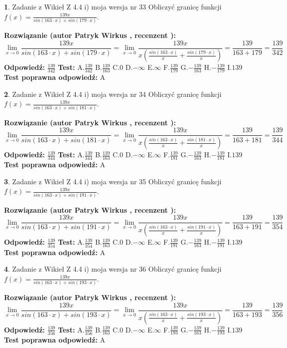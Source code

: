 \documentclass[12pt, a4paper]{article}
\theoremstyle{definition} %
\newtheorem{zad}{}
\newcommand{\zadStart}[1]{\begin{zad}#1\newline}
\newcommand{\zadStop}{\end{zad}}
\newcommand{\rozwStart}[2]{\noindent \textbf{Rozwiązanie (autor #1 , recenzent #2): }\newline}
\newcommand{\rozwStop}{\newline}
\newcommand{\odpStart}{\noindent \textbf{Odpowiedź:}\newline}
\newcommand{\odpStop}{\newline}
\newcommand{\testStart}{\noindent \textbf{Test:}\newline}
\newcommand{\testStop}{\newline}
\newcommand{\kluczStart}{\noindent \textbf{Test poprawna odpowiedź:}\newline}
\newcommand{\kluczStop}{\newline}
\begin{document}
\zadStart{Zadanie z Wikieł Z 4.4 i) moja wersja nr 33}
Obliczyć granicę funkcji $f(x)=\frac{139x}{sin(163\cdot x) +sin(179\cdot x)}$.
\zadStop
\rozwStart{Patryk Wirkus}{}
$$\lim\limits_{x\to 0}\frac{139x}{sin(163\cdot x) +sin(179\cdot x)}=\lim\limits_{x\to 0}\frac{139x}{x(\frac{sin(163\cdot x)}{x}+\frac{sin(179\cdot x)}{x})}=\frac{139}{163+179} = \frac{139}{342}$$
\rozwStop
\odpStart
$\frac{139}{342}$
\odpStop
\testStart
A.$\frac{139}{342}$
B.$\frac{139}{163}$
C.$0$
D.$-\infty$
E.$\infty$
F.$\frac{139}{179}$
G.$-\frac{139}{163}$
H.$-\frac{139}{179}$
I.$139$
\testStop
\kluczStart
A
\kluczStop



\zadStart{Zadanie z Wikieł Z 4.4 i) moja wersja nr 34}
Obliczyć granicę funkcji $f(x)=\frac{139x}{sin(163\cdot x) +sin(181\cdot x)}$.
\zadStop
\rozwStart{Patryk Wirkus}{}
$$\lim\limits_{x\to 0}\frac{139x}{sin(163\cdot x) +sin(181\cdot x)}=\lim\limits_{x\to 0}\frac{139x}{x(\frac{sin(163\cdot x)}{x}+\frac{sin(181\cdot x)}{x})}=\frac{139}{163+181} = \frac{139}{344}$$
\rozwStop
\odpStart
$\frac{139}{344}$
\odpStop
\testStart
A.$\frac{139}{344}$
B.$\frac{139}{163}$
C.$0$
D.$-\infty$
E.$\infty$
F.$\frac{139}{181}$
G.$-\frac{139}{163}$
H.$-\frac{139}{181}$
I.$139$
\testStop
\kluczStart
A
\kluczStop



\zadStart{Zadanie z Wikieł Z 4.4 i) moja wersja nr 35}
Obliczyć granicę funkcji $f(x)=\frac{139x}{sin(163\cdot x) +sin(191\cdot x)}$.
\zadStop
\rozwStart{Patryk Wirkus}{}
$$\lim\limits_{x\to 0}\frac{139x}{sin(163\cdot x) +sin(191\cdot x)}=\lim\limits_{x\to 0}\frac{139x}{x(\frac{sin(163\cdot x)}{x}+\frac{sin(191\cdot x)}{x})}=\frac{139}{163+191} = \frac{139}{354}$$
\rozwStop
\odpStart
$\frac{139}{354}$
\odpStop
\testStart
A.$\frac{139}{354}$
B.$\frac{139}{163}$
C.$0$
D.$-\infty$
E.$\infty$
F.$\frac{139}{191}$
G.$-\frac{139}{163}$
H.$-\frac{139}{191}$
I.$139$
\testStop
\kluczStart
A
\kluczStop



\zadStart{Zadanie z Wikieł Z 4.4 i) moja wersja nr 36}
Obliczyć granicę funkcji $f(x)=\frac{139x}{sin(163\cdot x) +sin(193\cdot x)}$.
\zadStop
\rozwStart{Patryk Wirkus}{}
$$\lim\limits_{x\to 0}\frac{139x}{sin(163\cdot x) +sin(193\cdot x)}=\lim\limits_{x\to 0}\frac{139x}{x(\frac{sin(163\cdot x)}{x}+\frac{sin(193\cdot x)}{x})}=\frac{139}{163+193} = \frac{139}{356}$$
\rozwStop
\odpStart
$\frac{139}{356}$
\odpStop
\testStart
A.$\frac{139}{356}$
B.$\frac{139}{163}$
C.$0$
D.$-\infty$
E.$\infty$
F.$\frac{139}{193}$
G.$-\frac{139}{163}$
H.$-\frac{139}{193}$
I.$139$
\testStop
\kluczStart
A
\kluczStop
\end{document}
